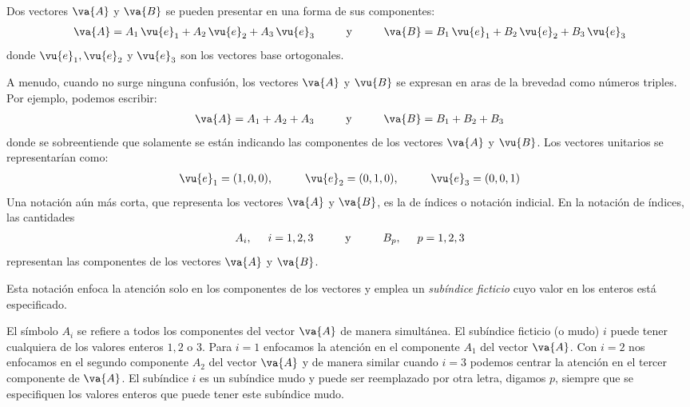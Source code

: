 Dos vectores $\va{A}$ y $\va{B}$ se pueden presentar en una forma de sus componentes:
\begin{align*}
\va{A} = A_{1} \, \vu{e}_{1} + A_{2} \, \vu{e}_{2} + A_{3} \, \vu{e}_{3} \hspace{1cm} \mbox{y} \hspace{1cm} \va{B} = B_{1} \, \vu{e}_{1} + B_{2} \, \vu{e}_{2} + B_{3} \, \vu{e}_{3}
\end{align*}
donde $\vu{e}_{1}, \vu{e}_{2}$ y $\vu{e}_{3}$ son los vectores base ortogonales.
\par
A menudo, cuando no surge ninguna confusión, los vectores $\va{A}$ y $\vu{B}$ se expresan en aras de la brevedad como números triples. Por ejemplo, podemos escribir:
\begin{align*}
\va{A} = A_{1} + A_{2} + A_{3}  \hspace{1cm} \mbox{y} \hspace{1cm} \va{B} = B_{1} + B_{2} + B_{3}
\end{align*}
donde se sobreentiende que solamente se están indicando las componentes de los vectores $\va{A}$ y $\vu{B}$. Los vectores unitarios se representarían como:
\begin{align*}
\vu{e}_{1} = (1, 0, 0), \hspace{1cm} \vu{e}_{2} = (0, 1, 0), \hspace{1cm} \vu{e}_{3} = (0, 0, 1)
\end{align*}
Una notación aún más corta, que representa los vectores $\va{A}$ y $\va{B}$, es la de índices o notación indicial. En la notación de índices, las cantidades
\begin{align*}
A_{i}, \hspace{0.5cm} i = 1, 2, 3 \hspace{1cm} \mbox{y} \hspace{1cm} B_{p}, \hspace{0.5cm} p = 1, 2, 3
\end{align*}
representan las componentes de los vectores $\va{A}$ y $\va{B}$.
\par
Esta notación enfoca la atención solo en los componentes de los vectores y emplea un \emph{subíndice ficticio} cuyo valor en los enteros está especificado.
\par
El símbolo $A_{i}$ se refiere a todos los componentes del vector $\va{A}$ de manera simultánea. El subíndice ficticio (o mudo) $i$ puede tener cualquiera de los valores enteros $1, 2$ o $3$. Para $i = 1$ enfocamos la atención en el componente $A_{1}$ del vector $\va{A}$. Con $i = 2$ nos enfocamos en el segundo componente $A_{2}$ del vector $\va{A}$ y de manera similar cuando $i = 3$ podemos centrar la atención en el tercer componente de $\va{A}$. El subíndice $i$ es un subíndice mudo y puede ser reemplazado por otra letra, digamos $p$, siempre que se especifiquen los valores enteros que puede tener este subíndice mudo.
